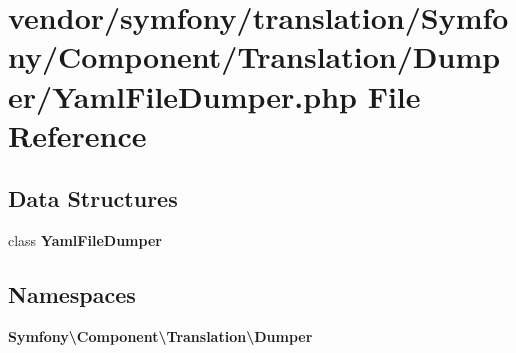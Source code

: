 \section{vendor/symfony/translation/\+Symfony/\+Component/\+Translation/\+Dumper/\+Yaml\+File\+Dumper.php File Reference}
\label{_yaml_file_dumper_8php}
\subsection*{Data Structures}
\begin{DoxyCompactItemize}
\item 
class {\bf Yaml\+File\+Dumper}
\end{DoxyCompactItemize}
\subsection*{Namespaces}
\begin{DoxyCompactItemize}
\item 
 {\bf Symfony\textbackslash{}\+Component\textbackslash{}\+Translation\textbackslash{}\+Dumper}
\end{DoxyCompactItemize}
